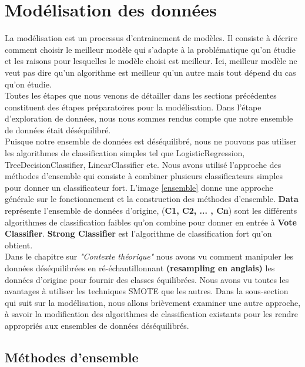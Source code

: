 \documentclass[12pt, french]{report}
\begin{document}
 


\section{Modélisation des données}

La modélisation est un processus d'entrainement de modèles. Il consiste à décrire comment choisir le meilleur modèle qui s'adapte à la problématique qu'on étudie et les raisons pour lesquelles le modèle choisi est meilleur. Ici, meilleur modèle ne veut pas dire qu'un algorithme est meilleur qu'un autre mais tout dépend du cas qu'on étudie.\\

Toutes les étapes que nous venons de détailler dans les sections précédentes constituent des étapes préparatoires pour la modélisation. Dans l'étape d'exploration de données, nous nous sommes rendus compte que notre ensemble de données était déséquilibré. \\ 

Puisque notre ensemble de données est déséquilibré, nous ne pouvons pas utiliser les algorithmes de classification simples tel que LogisticRegression, TreeDecisionClassifier, LinearClassifier etc. Nous avons utilisé l'approche des méthodes d'ensemble qui consiste à combiner plusieurs classificateurs simples pour donner un classificateur fort. L'image \ref{ensemble} donne une approche générale sur le fonctionnement et la construction des méthodes d'ensemble. \textbf{Data} représente l'ensemble de données d'origine, (\textbf{C1, C2, ... , Cn}) sont les différents algorithmes de classification faibles qu'on combine pour donner en entrée à \textbf{Vote Classifier}. \textbf{Strong Classifier} est l'algorithme de classification fort qu'on obtient. \\

Dans le chapitre sur \textit{"Contexte théorique"} nous avons vu comment manipuler les données déséquilibrées en ré-échantillonnant \textbf{(resampling en anglais)} les données d'origine pour fournir des classes équilibrées. Nous avons vu toutes les avantages à utiliser les techniques SMOTE que les autres. Dans la sous-section qui suit sur la modélisation, nous allons brièvement examiner une autre approche, à savoir la modification des algorithmes de classification existants pour les rendre appropriés aux ensembles de données déséquilibrés. 



\subsection{Méthodes d'ensemble}
\end{document}
